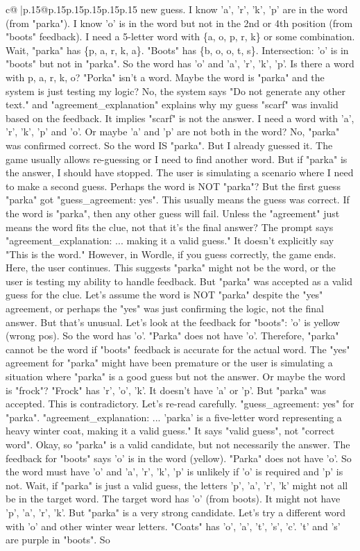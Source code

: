 \documentclass{article}
\begin{document}
{\begin{supertabular}{c@{$\;$}|p{.15\linewidth}@{}p{.15\linewidth}p{.15\linewidth}p{.15\linewidth}p{.15\linewidth}p{.15\linewidth}}
{{{new guess. I know 'a', 'r', 'k', 'p' are in the word (from "parka"). I know 'o' is in the word but not in the 2nd or 4th position (from "boots" feedback). I need a 5{-}letter word with \{a, o, p, r, k\} or some combination. Wait, "parka" has \{p, a, r, k, a\}. "Boots" has \{b, o, o, t, s\}. Intersection: 'o' is in "boots" but not in "parka". So the word has 'o' and 'a', 'r', 'k', 'p'. Is there a word with p, a, r, k, o? "Porka" isn't a word. Maybe the word is "parka" and the system is just testing my logic? No, the system says "Do not generate any other text." and "agreement\_explanation" explains why my guess "scarf" was invalid based on the feedback. It implies "scarf" is not the answer. I need a word with 'a', 'r', 'k', 'p' and 'o'. Or maybe 'a' and 'p' are not both in the word? No, "parka" was confirmed correct. So the word IS "parka". But I already guessed it. The game usually allows re{-}guessing or I need to find another word. But if "parka" is the answer, I should have stopped. The user is simulating a scenario where I need to make a second guess. Perhaps the word is NOT "parka"? But the first guess "parka" got "guess\_agreement: yes". This usually means the guess was correct. If the word is "parka", then any other guess will fail. Unless the "agreement" just means the word fits the clue, not that it's the final answer? The prompt says "agreement\_explanation: ... making it a valid guess." It doesn't explicitly say "This is the word." However, in Wordle, if you guess correctly, the game ends. Here, the user continues. This suggests "parka" might not be the word, or the user is testing my ability to handle feedback. But "parka" was accepted as a valid guess for the clue. Let's assume the word is NOT "parka" despite the "yes" agreement, or perhaps the "yes" was just confirming the logic, not the final answer. But that's unusual. Let's look at the feedback for "boots": 'o' is yellow (wrong pos). So the word has 'o'. "Parka" does not have 'o'. Therefore, "parka" cannot be the word if "boots" feedback is accurate for the actual word. The "yes" agreement for "parka" might have been premature or the user is simulating a situation where "parka" is a good guess but not the answer. Or maybe the word is "frock"? "Frock" has 'r', 'o', 'k'. It doesn't have 'a' or 'p'. But "parka" was accepted. This is contradictory. Let's re{-}read carefully. "guess\_agreement: yes" for "parka". "agreement\_explanation: ... 'parka' is a five{-}letter word representing a heavy winter coat, making it a valid guess." It says "valid guess", not "correct word". Okay, so "parka" is a valid candidate, but not necessarily the answer. The feedback for "boots" says 'o' is in the word (yellow). "Parka" does not have 'o'. So the word must have 'o' and 'a', 'r', 'k', 'p' is unlikely if 'o' is required and 'p' is not. Wait, if "parka" is just a valid guess, the letters 'p', 'a', 'r', 'k' might not all be in the target word. The target word has 'o' (from boots). It might not have 'p', 'a', 'r', 'k'. But "parka" is a very strong candidate. Let's try a different word with 'o' and other winter wear letters. "Coats" has 'o', 'a', 't', 's', 'c'. 't' and 's' are purple in "boots". So }}}
\end{supertabular}}
\end{document}
